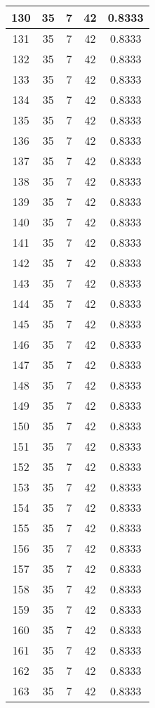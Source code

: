 \documentclass[letterpaper, 12pt]{article}
\begin{document}
\begin{longtable}{|c|c|c|c|c|}
\hline
130 & 35 & 7 & 42 & 0.8333 \\
\hline
131 & 35 & 7 & 42 & 0.8333 \\
\hline
132 & 35 & 7 & 42 & 0.8333 \\
\hline
133 & 35 & 7 & 42 & 0.8333 \\
\hline
134 & 35 & 7 & 42 & 0.8333 \\
\hline
135 & 35 & 7 & 42 & 0.8333 \\
\hline
136 & 35 & 7 & 42 & 0.8333 \\
\hline
137 & 35 & 7 & 42 & 0.8333 \\
\hline
138 & 35 & 7 & 42 & 0.8333 \\
\hline
139 & 35 & 7 & 42 & 0.8333 \\
\hline
140 & 35 & 7 & 42 & 0.8333 \\
\hline
141 & 35 & 7 & 42 & 0.8333 \\
\hline
142 & 35 & 7 & 42 & 0.8333 \\
\hline
143 & 35 & 7 & 42 & 0.8333 \\
\hline
144 & 35 & 7 & 42 & 0.8333 \\
\hline
145 & 35 & 7 & 42 & 0.8333 \\
\hline
146 & 35 & 7 & 42 & 0.8333 \\
\hline
147 & 35 & 7 & 42 & 0.8333 \\
\hline
148 & 35 & 7 & 42 & 0.8333 \\
\hline
149 & 35 & 7 & 42 & 0.8333 \\
\hline
150 & 35 & 7 & 42 & 0.8333 \\
\hline
151 & 35 & 7 & 42 & 0.8333 \\
\hline
152 & 35 & 7 & 42 & 0.8333 \\
\hline
153 & 35 & 7 & 42 & 0.8333 \\
\hline
154 & 35 & 7 & 42 & 0.8333 \\
\hline
155 & 35 & 7 & 42 & 0.8333 \\
\hline
156 & 35 & 7 & 42 & 0.8333 \\
\hline
157 & 35 & 7 & 42 & 0.8333 \\
\hline
158 & 35 & 7 & 42 & 0.8333 \\
\hline
159 & 35 & 7 & 42 & 0.8333 \\
\hline
160 & 35 & 7 & 42 & 0.8333 \\
\hline
161 & 35 & 7 & 42 & 0.8333 \\
\hline
162 & 35 & 7 & 42 & 0.8333 \\
\hline
163 & 35 & 7 & 42 & 0.8333 \\

\end{longtable}
\end{document}
